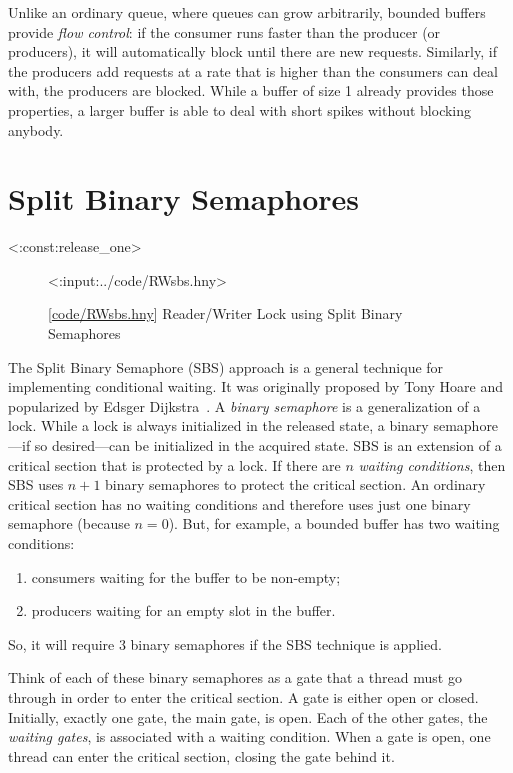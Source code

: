 \documentclass{report}
\newcommand{\harmonylink}[1]{%
[\href{https://harmony.cs.cornell.edu/#1}{\underline{#1}}]%
}
\newenvironment{code}{
\tcolorbox
}{
\endtcolorbox
}
\begin{document}
%
Unlike an ordinary queue, where queues can grow arbitrarily, bounded buffers
provide \emph{flow control}: if the consumer runs faster than the producer
(or producers), it will automatically block until there are new requests.
Similarly, if the producers add requests at a rate that is higher than the
consumers can deal with, the producers are blocked.  While a buffer of size 1
already provides those properties, a larger buffer is able to deal with short
spikes without blocking anybody.

\chapter{Split Binary Semaphores}
\label{ch:sbs}
%

<{:const:release_one}>

\begin{figure}
\begin{code}
<{:input:../code/RWsbs.hny}>
\end{code}
\caption{\harmonylink{code/RWsbs.hny} Reader/Writer Lock using Split Binary Semaphores}
\label{fig:RWsplitsema}
\end{figure}

%

The Split Binary Semaphore (SBS) approach is a general technique for
implementing conditional waiting.  It was originally proposed by
Tony Hoare and popularized by Edsger Dijkstra~\cite{EWD703}.
A \emph{binary semaphore} is a generalization of a lock.  While a lock
is always initialized in the released state, a binary semaphore---if so
desired---can be initialized in the acquired state.
SBS is an extension of a critical section that is protected by a lock.
If there are $n$ \emph{waiting conditions},
then SBS uses $n+1$ binary semaphores to protect the critical section.
An ordinary critical section has no waiting conditions and therefore
uses just one binary semaphore (because $n = 0$).
But, for example, a bounded buffer has two waiting conditions:
\begin{enumerate}
\item consumers waiting for the buffer to be non-empty;
\item producers waiting for an empty slot in the buffer.
\end{enumerate}
So, it will require 3 binary semaphores if the SBS technique is applied.

Think of each of these binary semaphores as a gate that a thread must go
through in order to enter the critical section.  A gate is either open
or closed.  Initially, exactly one gate, the main gate, is open.
Each of the other gates, the \emph{waiting gates}, is associated with a
waiting condition.
When a gate is open, one thread can enter the critical section,
closing the gate behind it.
\end{document}
